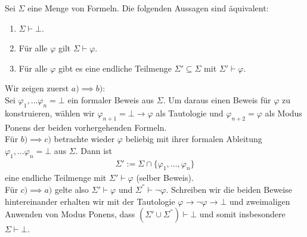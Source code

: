
\begin{exercise}[96]

Sei $\Sigma$ eine Menge von Formeln. Die folgenden Aussagen sind äquivalent:

\begin{enumerate}[label = \alph*)]
  \item $\Sigma \vdash \bot$.
  \item Für alle $\varphi$ gilt $\Sigma \vdash \varphi$.
  \item Für alle $\varphi$ gibt es eine endliche Teilmenge $\Sigma' \subseteq \Sigma$ mit $\Sigma' \vdash \varphi$.
\end{enumerate}
\end{exercise}


\begin{solution}

Wir zeigen zuerst $a) \implies b)$: \\
Sei $\varphi_1, \dots \varphi_n = \bot$ ein formaler Beweis aus $\Sigma$.
Um daraus einen Beweis für $\varphi$ zu konstruieren, wählen wir
$\varphi_{n + 1} = \bot \rightarrow \varphi$ als Tautologie und $\varphi_{n + 2} = \varphi$
als Modus Ponens der beiden vorhergehenden Formeln. \\
Für $b) \implies c)$ betrachte wieder $\varphi$ beliebig mit ihrer formalen Ableitung
 $\varphi_1, \dots \varphi_n = \bot$ aus $\Sigma$. Dann ist
 \begin{align*}
   \Sigma' := \Sigma \cap \{\varphi_1,\dots,\varphi_n\}
 \end{align*}
 eine endliche Teilmenge mit $\Sigma' \vdash \varphi$ (selber Beweis). \\
 Für $c) \implies a)$ gelte also $\Sigma' \vdash \varphi$ und
 $\Sigma^{''} \vdash \neg \varphi$. Schreiben wir die beiden Beweise hintereinander
 erhalten wir mit der Tautologie $\varphi \rightarrow \neg \varphi \rightarrow \bot$
 und zweimaligen Anwenden von Modus Ponens, dass $(\Sigma' \cup \Sigma^{''}) \vdash \bot$
 und somit insbesondere $\Sigma \vdash \bot$.

\end{solution}

